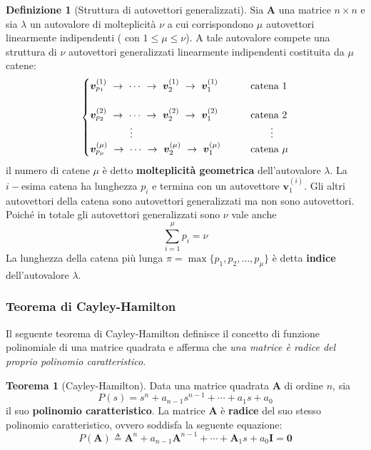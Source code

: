 \documentclass[a4paper]{article}
\renewcommand{\vec}{\bm}
\theoremstyle{definition}
\newtheorem{thm}{Teorema}[subsection]
\newtheorem{defn}{Definizione}[subsection]
\begin{document}
			\begin{defn}[Struttura di autovettori generalizzati]
				Sia $ \vec{A} $ una matrice $ n\times n $ e sia $ \lambda $ un autovalore di molteplicità $ \nu $ a cui corrispondono $ \mu $ autovettori linearmente indipendenti ( con $ 1\leq \mu \leq \nu $).
				A tale autovalore compete una struttura di $ \nu $ autovettori generalizzati linearmente indipendenti costituita da $ \mu $ catene:
				\[
					\begin{cases}
						\vec{v}_{p_1}^{(1)}\ \rightarrow\ \cdots \ \rightarrow\ \vec{v}_{2}^{(1)}\ \rightarrow\ \vec{v}_{1}^{(1)} \qquad & \textup{catena 1} \\ \\
						\vec{v}_{p_2}^{(2)}\ \rightarrow\ \cdots \ \rightarrow\ \vec{v}_{2}^{(2)}\ \rightarrow\ \vec{v}_{1}^{(2)} \qquad & \textup{catena 2} \\
						\qquad\qquad \vdots & \qquad \vdots \\
						\vec{v}_{p_\mu}^{(\mu)}\ \rightarrow\ \cdots \ \rightarrow\ \vec{v}_{2}^{(\mu)}\ \rightarrow\ \vec{v}_{1}^{(\mu)} \qquad & \textup{catena }\mu 
					\end{cases}
				\]
				il numero di catene $ \mu $ è detto \textbf{molteplicità geometrica} dell'autovalore $ \lambda $.
				La $ i-$esima catena ha lunghezza $ p_i $ e termina con un autovettore $ \vec{v}_1^{(i)} $. Gli altri autovettori della catena sono autovettori generalizzati ma non sono autovettori. Poiché in totale gli autovettori generalizzati sono $ \nu $ vale anche 
				\[
					\sum_{i=1}^{\mu} p_i = \nu
				\]
				La lunghezza della catena più lunga $ \pi = \max \{p_1,p_2,\dots,p_{\mu}\} $ è detta \textbf{indice} dell'autovalore $ \lambda $.
 			\end{defn}
 			
 			\subsubsection{Teorema di Cayley-Hamilton}
	 			Il seguente teorema di Cayley-Hamilton definisce il concetto di funzione polinomiale di una matrice quadrata e afferma che \textit{una matrice è radice del proprio polinomio caratteristico}.
	 			
	 			\begin{thm}[Cayley-Hamilton]
					Data una matrice quadrata $ \vec{A} $ di ordine $ n $, sia
					\[
						P(s) = s^n + a_{n-1}s^{n-1} + \cdots + a_1 s + a_0
					\]
					il suo \textbf{polinomio caratteristico}. La matrice $ \vec{A} $ è \textbf{radice} del suo stesso polinomio caratteristico, ovvero soddisfa la seguente equazione:
					\[
						P(\vec{A}) \triangleq \vec{A}^n + a_{n-1} \vec{A}^{n-1} + \cdots + \vec{A}_1 s + a_0\vec{I} = \vec{0}
					\]
	 			\end{thm}
	 			
\end{document}
